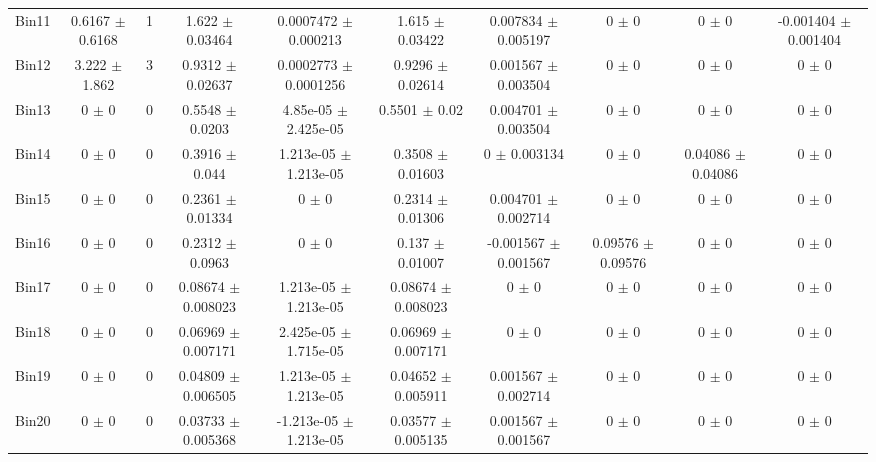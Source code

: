 \begin{tabular}{@{\extracolsep{4pt}}lccccccccc@{}}
     Bin11 & 0.6167 $\pm$ 0.6168 & 1 & 1.622 $\pm$ 0.03464 & 0.0007472 $\pm$ 0.000213 & 1.615 $\pm$ 0.03422 & 0.007834 $\pm$ 0.005197 & 0 $\pm$ 0 & 0 $\pm$ 0 & -0.001404 $\pm$ 0.001404 \\ 
     Bin12 & 3.222 $\pm$ 1.862 & 3 & 0.9312 $\pm$ 0.02637 & 0.0002773 $\pm$ 0.0001256 & 0.9296 $\pm$ 0.02614 & 0.001567 $\pm$ 0.003504 & 0 $\pm$ 0 & 0 $\pm$ 0 & 0 $\pm$ 0 \\ 
     Bin13 & 0 $\pm$ 0 & 0 & 0.5548 $\pm$ 0.0203 & 4.85e-05 $\pm$ 2.425e-05 & 0.5501 $\pm$ 0.02 & 0.004701 $\pm$ 0.003504 & 0 $\pm$ 0 & 0 $\pm$ 0 & 0 $\pm$ 0 \\ 
     Bin14 & 0 $\pm$ 0 & 0 & 0.3916 $\pm$ 0.044 & 1.213e-05 $\pm$ 1.213e-05 & 0.3508 $\pm$ 0.01603 & 0 $\pm$ 0.003134 & 0 $\pm$ 0 & 0.04086 $\pm$ 0.04086 & 0 $\pm$ 0 \\ 
     Bin15 & 0 $\pm$ 0 & 0 & 0.2361 $\pm$ 0.01334 & 0 $\pm$ 0 & 0.2314 $\pm$ 0.01306 & 0.004701 $\pm$ 0.002714 & 0 $\pm$ 0 & 0 $\pm$ 0 & 0 $\pm$ 0 \\ 
     Bin16 & 0 $\pm$ 0 & 0 & 0.2312 $\pm$ 0.0963 & 0 $\pm$ 0 & 0.137 $\pm$ 0.01007 & -0.001567 $\pm$ 0.001567 & 0.09576 $\pm$ 0.09576 & 0 $\pm$ 0 & 0 $\pm$ 0 \\ 
     Bin17 & 0 $\pm$ 0 & 0 & 0.08674 $\pm$ 0.008023 & 1.213e-05 $\pm$ 1.213e-05 & 0.08674 $\pm$ 0.008023 & 0 $\pm$ 0 & 0 $\pm$ 0 & 0 $\pm$ 0 & 0 $\pm$ 0 \\ 
     Bin18 & 0 $\pm$ 0 & 0 & 0.06969 $\pm$ 0.007171 & 2.425e-05 $\pm$ 1.715e-05 & 0.06969 $\pm$ 0.007171 & 0 $\pm$ 0 & 0 $\pm$ 0 & 0 $\pm$ 0 & 0 $\pm$ 0 \\ 
     Bin19 & 0 $\pm$ 0 & 0 & 0.04809 $\pm$ 0.006505 & 1.213e-05 $\pm$ 1.213e-05 & 0.04652 $\pm$ 0.005911 & 0.001567 $\pm$ 0.002714 & 0 $\pm$ 0 & 0 $\pm$ 0 & 0 $\pm$ 0 \\ 
     Bin20 & 0 $\pm$ 0 & 0 & 0.03733 $\pm$ 0.005368 & -1.213e-05 $\pm$ 1.213e-05 & 0.03577 $\pm$ 0.005135 & 0.001567 $\pm$ 0.001567 & 0 $\pm$ 0 & 0 $\pm$ 0 & 0 $\pm$ 0 \\ 
\hline\hline
  \end{tabular}
